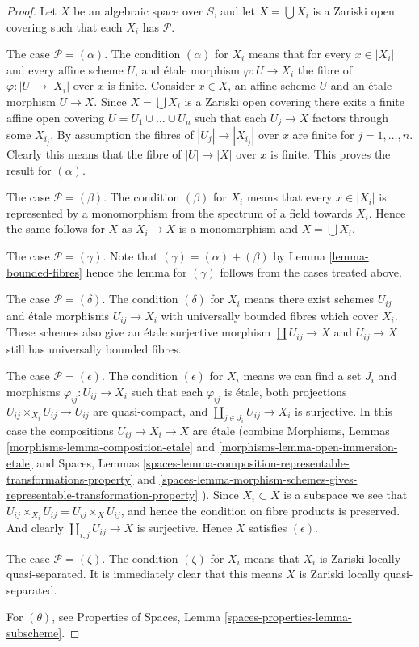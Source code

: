 \begin{proof}
Let $X$ be an algebraic space over $S$, and let $X = \bigcup X_i$ is a
Zariski open covering such that each $X_i$ has $\mathcal{P}$.

\medskip\noindent
The case $\mathcal{P} = (\alpha)$. The condition $(\alpha)$ for $X_i$
means that for every $x \in |X_i|$ and every affine scheme $U$, and
\'etale morphism $\varphi : U \to X_i$ the fibre of $\varphi : |U| \to |X_i|$
over $x$ is finite. Consider $x \in X$, an affine scheme $U$ and
an \'etale morphism $U \to X$. Since $X = \bigcup X_i$ is a
Zariski open covering there exits a finite affine open covering
$U = U_1 \cup \ldots \cup U_n$ such that each $U_j \to X$ factors through
some $X_{i_j}$. By assumption the fibres of $|U_j | \to |X_{i_j}|$
over $x$ are finite for $j = 1, \ldots, n$. Clearly this means that
the fibre of $|U| \to |X|$ over $x$ is finite.
This proves the result for $(\alpha)$.

\medskip\noindent
The case $\mathcal{P} = (\beta)$. The condition $(\beta)$ for $X_i$ means
that every $x \in |X_i|$ is represented by a monomorphism from the
spectrum of a field towards $X_i$. Hence the same follows for $X$
as $X_i \to X$ is a monomorphism and $X = \bigcup X_i$.

\medskip\noindent
The case $\mathcal{P} = (\gamma)$.
Note that $(\gamma) = (\alpha) + (\beta)$ by
Lemma \ref{lemma-bounded-fibres}
hence the lemma for $(\gamma)$ follows from the cases treated above.

\medskip\noindent
The case $\mathcal{P} = (\delta)$. The condition $(\delta)$ for $X_i$ means
there exist schemes $U_{ij}$ and \'etale morphisms $U_{ij} \to X_i$ with
universally bounded fibres which cover $X_i$. These schemes also give an
\'etale surjective morphism $\coprod U_{ij} \to X$ and $U_{ij} \to X$
still has universally bounded fibres.

\medskip\noindent
The case $\mathcal{P} = (\epsilon)$. The condition $(\epsilon)$ for $X_i$ means
we can find a set $J_i$ and morphisms
$\varphi_{ij} : U_{ij} \to X_i$ such that each $\varphi_{ij}$
is \'etale, both projections $U_{ij} \times_{X_i} U_{ij} \to U_{ij}$
are quasi-compact, and $\coprod_{j \in J_i} U_{ij} \to X_i$ is surjective.
In this case the compositions $U_{ij} \to X_i \to X$ are \'etale
(combine
Morphisms, Lemmas
\ref{morphisms-lemma-composition-etale} and
\ref{morphisms-lemma-open-immersion-etale}
and
Spaces, Lemmas
\ref{spaces-lemma-composition-representable-transformations-property} and
\ref{spaces-lemma-morphism-schemes-gives-representable-transformation-property}
).
Since $X_i \subset X$ is a subspace we see that
$U_{ij} \times_{X_i} U_{ij} = U_{ij} \times_X U_{ij}$, and hence the
condition on fibre products is preserved. And clearly
$\coprod_{i, j} U_{ij} \to X$ is surjective. Hence $X$
satisfies $(\epsilon)$.

\medskip\noindent
The case $\mathcal{P} = (\zeta)$. The condition $(\zeta)$ for $X_i$
means that $X_i$ is Zariski locally quasi-separated. It is immediately
clear that this means $X$ is Zariski locally quasi-separated.

\medskip\noindent
For $(\theta)$, see
Properties of Spaces,
Lemma \ref{spaces-properties-lemma-subscheme}.
\end{proof}

